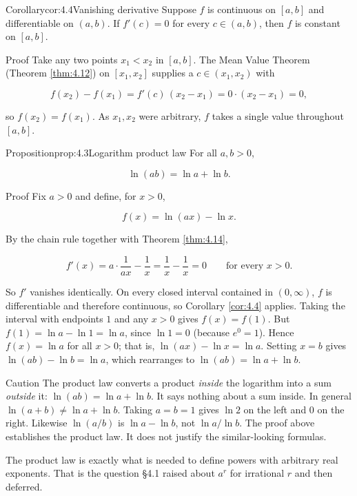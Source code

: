 \documentclass[a4paper,12pt,oneside]{memoir}
\begin{document}
\begin{envcorollary}{Corollary}{cor:4.4}{Vanishing derivative}
Suppose \(f\) is continuous on \([a, b]\) and differentiable on \((a, b)\). If \(f'(c) = 0\) for every \(c \in (a, b)\), then \(f\) is constant on \([a, b]\).
\end{envcorollary}
\begin{envproof}{Proof}{}{}
Take any two points \(x_{1} < x_{2}\) in \([a, b]\). The Mean Value Theorem (Theorem \ref{thm:4.12}) on \([x_{1}, x_{2}]\) supplies a \(c \in (x_{1}, x_{2})\) with

\[ f(x_{2}) - f(x_{1}) = f'(c)\,(x_{2} - x_{1}) = 0 \cdot (x_{2} - x_{1}) = 0, \]

so \(f(x_{2}) = f(x_{1})\). As \(x_{1}, x_{2}\) were arbitrary, \(f\) takes a single value throughout \([a, b]\). \qedmark
\end{envproof}
\begin{envproposition}{Proposition}{prop:4.3}{Logarithm product law}
For all \(a, b > 0\),

\[ \ln(ab) = \ln a + \ln b. \]
\end{envproposition}
\begin{envproof}{Proof}{}{}
Fix \(a > 0\) and define, for \(x > 0\),

\[ f(x) = \ln(ax) - \ln x. \]

By the chain rule together with Theorem \ref{thm:4.14},

\[ f'(x) = a \cdot \frac{1}{ax} - \frac{1}{x} = \frac{1}{x} - \frac{1}{x} = 0 \qquad \text{for every } x > 0. \]

So \(f'\) vanishes identically. On every closed interval contained in \((0, \infty)\), \(f\) is differentiable and therefore continuous, so Corollary \ref{cor:4.4} applies. Taking the interval with endpoints \(1\) and any \(x > 0\) gives \(f(x) = f(1)\). But \(f(1) = \ln a - \ln 1 = \ln a\), since \(\ln 1 = 0\) (because \(e^{0} = 1\)). Hence \(f(x) = \ln a\) for all \(x > 0\); that is, \(\ln(ax) - \ln x = \ln a\). Setting \(x = b\) gives \(\ln(ab) - \ln b = \ln a\), which rearranges to \(\ln(ab) = \ln a + \ln b\). \qedmark
\end{envproof}
\begin{envcaution}{Caution}{}{}
The product law converts a product \emph{inside} the logarithm into a sum \emph{outside} it: \(\ln(ab) = \ln a + \ln b\). It says nothing about a sum inside. In general \(\ln(a + b) \ne \ln a + \ln b\). Taking \(a = b = 1\) gives \(\ln 2\) on the left and \(0\) on the right. Likewise \(\ln(a/b)\) is \(\ln a - \ln b\), not \(\ln a / \ln b\). The proof above establishes the product law. It does not justify the similar-looking formulas.
\end{envcaution}
The product law is exactly what is needed to define powers with arbitrary real exponents. That is the question §4.1 raised about \(a^{r}\) for irrational \(r\) and then deferred.
\end{document}
